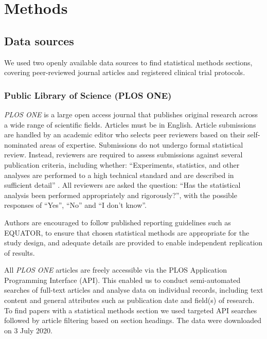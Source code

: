 \documentclass[12pt]{article}
\begin{document}
\hypertarget{methods}{%
\section{Methods}\label{methods}}

\subsection{Data sources}

We used two openly available data sources to find statistical methods
sections, covering peer-reviewed journal articles and registered
clinical trial protocols.

\subsubsection{Public Library of Science (PLOS ONE)}
\label{sec:methodsPLOS}

\emph{PLOS ONE} is a large open access journal that publishes original
research across a wide range of scientific fields. Articles must be in
English. Article submissions are handled by an academic editor who
selects peer reviewers based on their self-nominated areas of expertise.
Submissions do not undergo formal statistical review. Instead, reviewers
are required to assess submissions against several publication criteria,
including whether: ``Experiments, statistics, and other analyses are
performed to a high technical standard and are described in sufficient
detail'' \citep{PLOS}. All reviewers are asked the question: ``Has the
statistical analysis been performed appropriately and rigorously?'',
with the possible responses of ``Yes'', ``No'' and ``I don't know''.

Authors are encouraged to follow published reporting guidelines such as
EQUATOR, to ensure that chosen statistical methods are appropriate for
the study design, and adequate details are provided to enable
independent replication of results.

All \emph{PLOS ONE} articles are freely accessible via the PLOS
Application Programming Interface (API). This enabled us to conduct
semi-automated searches of full-text articles and analyse data on
individual records, including text content and general attributes such
as publication date and field(s) of research. To find papers with a
statistical methods section we used targeted API searches followed by
article filtering based on section headings. The data were downloaded on
3 July 2020.
\end{document}
